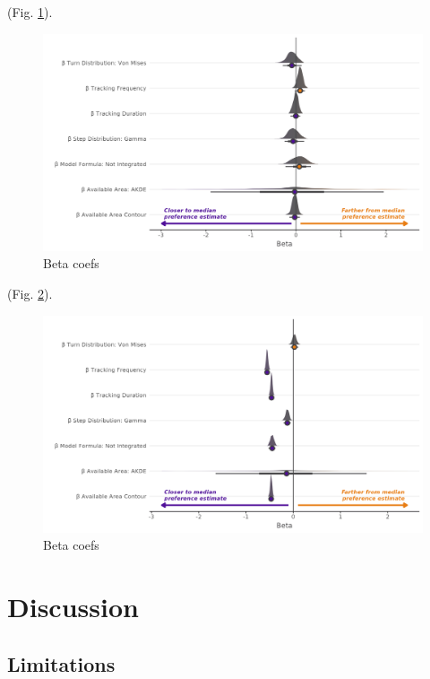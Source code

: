 \documentclass[10pt,a4paper]{article}
\begin{document}
(Fig. \ref{fig:effectPlotTwoStep}).

\begin{figure}
\includegraphics[width=1\linewidth]{../figures/twoStepBrms_effectsPlot} \caption{Beta coefs}\label{fig:effectPlotTwoStep}
\end{figure}

(Fig. \ref{fig:effectPlotPois}).

\begin{figure}
\includegraphics[width=1\linewidth]{../figures/poisBrms_effectsPlot} \caption{Beta coefs}\label{fig:effectPlotPois}
\end{figure}

\hypertarget{discussion}{%
\section{Discussion}\label{discussion}}

\hypertarget{limitations}{%
\subsection{Limitations}\label{limitations}}
\end{document}
